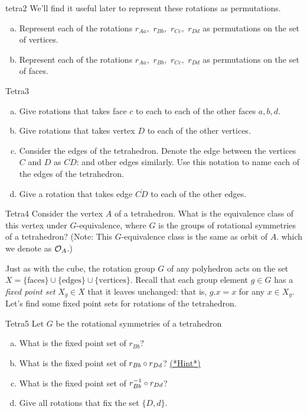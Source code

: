 \begin{exercise}{tetra2}
We'll find it useful later to represent these rotations as permutations.
\begin{enumerate}[(a)] 
\item Represent each of the rotations $r_{Aa},$ $r_{Bb},$ $r_{Cc},$ $r_{Dd}$ as permutations on the set of vertices.
\item Represent each of the rotations $r_{Aa},$ $r_{Bb},$ $r_{Cc},$ $r_{Dd}$ as permutations on the set of faces.
\end{enumerate}
\end {exercise}
\begin{exercise}{Tetra3}
\begin{enumerate}[(a)]
\item Give rotations that takes face $c$ to each to each of the other faces $a, b, d$.
\item Give rotations that takes vertex $D$ to each of the other vertices.
\item Consider the edges of the tetrahedron.  Denote the edge between the vertices $C$ and $D$ as $\overline{CD}$: and other edges similarly.  Use this notation to name each of the edges of the tetrahedron.
 \item Give a rotation that takes edge $\overline{CD}$ to each of the other edges.
\end{enumerate}
\end{exercise} 
\begin{exercise}{Tetra4}
Consider the vertex $A$ of a tetrahedron.  What is the equivalence class of this vertex under $G$-equivalence, where $G$ is the groups of rotational symmetries of a tetrahedron?   (Note:  This $G$-equivalence class is the same as orbit of $A$. which we denote as ${\cal O}_A$.)
\end {exercise}


Just as with the cube, the rotation group $G$ of any polyhedron acts on the set $X=\{\text{faces}\}\cup\{\text{edges}\}\cup\{\text{vertices}\}$. Recall that each group element $g\in G$ has a \emph{fixed point set} $X_g\in X$ that it leaves unchanged: that is, $g.x=x$ for any $x\in X_g$. Let's find some fixed point sets for rotations of the tetrahedron.

\begin{exercise}{Tetra5}
Let $G$ be the rotational symmetries of a tetrahedron
\begin{enumerate}[(a)]
\item  What is the fixed point set of $r_{Bb}$?
\item What is the fixed point set of $r_{Bb}\circ r_{Dd}$? 
\hyperref[sec:actions:hints]{(*Hint*)}
\item What is the fixed point set of $r_{Bb}^{-1}\circ r_{Dd}$?
\item Give all rotations that fix the set $\{D,d\}$. 
\end{enumerate}
\end {exercise}


